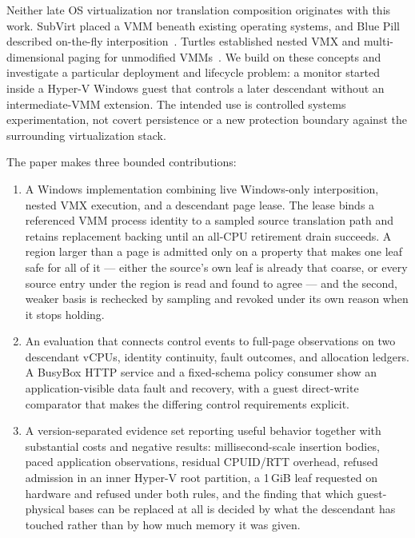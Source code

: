 Neither late OS virtualization nor translation composition originates with this
work. SubVirt placed a VMM beneath existing operating systems, and Blue Pill
described on-the-fly interposition~\cite{subvirt,bluepill}. Turtles established
nested VMX and multi-dimensional paging for unmodified
VMMs~\cite{turtles}. We build on these concepts and investigate a particular
deployment and lifecycle problem: a monitor started inside a Hyper-V Windows
guest that controls a later descendant without an intermediate-VMM extension.
The intended use is controlled systems experimentation, not covert persistence
or a new protection boundary against the surrounding virtualization stack.

The paper makes three bounded contributions:
\begin{enumerate}
\item A Windows implementation combining live Windows-only interposition,
      nested VMX execution, and a descendant page lease. The lease binds a
      referenced VMM process identity to a sampled source translation path and
      retains replacement backing until an all-CPU retirement drain succeeds.
      A region larger than a page is admitted only on a property that makes one
      leaf safe for all of it --- either the source's own leaf is already that
      coarse, or every source entry under the region is read and found to agree
      --- and the second, weaker basis is rechecked by sampling and revoked
      under its own reason when it stops holding.
\item An evaluation that connects control events to full-page observations on
      two descendant vCPUs, identity continuity, fault outcomes, and allocation
      ledgers. A BusyBox HTTP service and a fixed-schema policy consumer show
      an application-visible data fault and recovery, with a guest direct-write
      comparator that makes the differing control requirements explicit.
\item A version-separated evidence set reporting useful behavior together with
      substantial costs and negative results: millisecond-scale insertion
      bodies, paced application observations, residual CPUID/RTT overhead,
      refused admission in an inner Hyper-V root partition, a 1\,GiB leaf
      requested on hardware and refused under both rules, and the finding that
      which guest-physical bases can be replaced at all is decided by what the
      descendant has touched rather than by how much memory it was given.
\end{enumerate}

